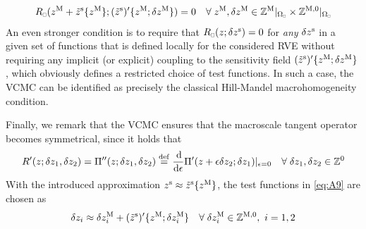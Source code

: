 \documentclass[MikaelDissertation.tex]{subfiles}
\begin{document}
\begin{align}
\label{eq:A8} R_\rve(z^\macro + \tilde z^\fluct\{z^\macro\};(\tilde{z}^\fluct)'\{z^\macro;\delta z^\macro\}) = 0\quad \forall\;z^\macro,\delta z^\macro\in\set Z^{\macro}|_{\Omega_\rve}\times\set Z^{\macro,0}|_{\Omega_\rve}
\end{align}
An even stronger condition is to require that $R_\rve(z;\delta z^\fluct) = 0$ for \emph{any} $\delta z^{\mathrm{s}}$ in a given set of functions that is defined locally for the considered RVE without requiring any implicit (or explicit) 
coupling to the sensitivity field $(\tilde{z}^{\mathrm{s}})'\{z^{\mathrm{M}};\delta z^{\mathrm{M}}\}$, which obviously defines a restricted choice of test functions.
In such a case, the VCMC can be identified as precisely the classical Hill-Mandel macrohomogeneity condition.

Finally, we remark that the VCMC ensures that the macroscale tangent operator becomes symmetrical, since it holds that
\begin{align}
\label{eq:A9} R'(z;\delta z_1,\delta z_2) = \Pi''(z;\delta z_1,\delta z_2) \overset{\mathrm{def}}{=} \frac{\operatorname{d \!}}{\operatorname{d \!}\epsilon}\Pi'(z+\epsilon\delta z_2;\delta z_1)|_{\epsilon=0}\quad \forall\;\delta z_1,\delta z_2 \in \mathbb{Z}^0
\end{align}
With the introduced approximation $z^{\mathrm{s}} \approx \tilde{z}^{\mathrm{s}}\{z^{\mathrm{M}}\}$, the test functions in \cref{eq:A9} are chosen as
\begin{align}
\label{eq:A10} \delta z_i \approx \delta z_i^{\mathrm{M}} + (\tilde{z}^{\mathrm{s}})'\{z^{\mathrm{M}};\delta z_i^{\mathrm{M}}\} \quad \forall\;\delta z_i^{\mathrm{M}}\in\mathbb{Z}^{\mathrm{M},0}, \,\, i=1,2
\end{align}
\end{document}
